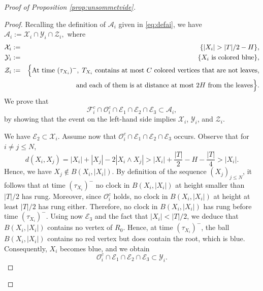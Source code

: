 \documentclass[french]{article}
\newcommand{\Tf}{T}
\renewcommand{\1}{\mathds{1}}
\begin{document}
\begin{proof}[Proof of Proposition \ref{prop:unsommetvide}]
\begin{proof}
Recalling the definition of $\mathcal{A}_i$ given in \eqref{eq:defai}, we have
$
\mathcal{A}_i := \mathcal{X}_i \cap \mathcal{Y}_i \cap \mathcal{Z}_i,
$
where
\begin{eqnarray*}
\mathcal{X}_i &:=& \{|X_i|>|\Tf|/2-H\},\\
\mathcal{Y}_i &:=& \{\text{$X_i$ is colored blue}\},\\
\mathcal{Z}_i &:=& \Bigl\{\text{At time } (\tau_{X_i})^{-},\; \Tf_{X_i} \text{ contains at most } C \text{ colored vertices that are not leaves,}\\
&& \qquad\quad \text{and each of them is at distance at most } 2H \text{ from the leaves}\Bigr\}.
\end{eqnarray*}
We prove that
$$
\mathcal{F}_i^c \cap \mathcal{O}_i^c \cap \mathcal{E}_1 \cap \mathcal{E}_2 \cap \mathcal{E}_3 \subset \mathcal{A}_i,
$$
by showing that the event on the left-hand side implies $\mathcal{X}_i$, $\mathcal{Y}_i$, and $\mathcal{Z}_i$.

\medskip

\noindent We have $\mathcal{E}_2 \subset \mathcal{X}_i$. Assume now that $\mathcal{O}_i^c \cap \mathcal{E}_1 \cap \mathcal{E}_2 \cap \mathcal{E}_3$ occurs. Observe that for $i \neq j \le N$,
$$
d(X_i,X_j)
= |X_i| + |X_j| - 2|X_i \wedge X_j|
> |X_i| + \frac{|\Tf|}{2} - H - \frac{|\Tf|}{4}
> |X_i|.
$$
Hence, we have $X_j \notin B(X_i,|X_i|)$. By definition of the sequence $(X_j)_{j\le N}$, it follows that at time $(\tau_{X_i})^{-}$ no clock in $B(X_i,|X_i|)$ at height smaller than $|\Tf|/2$ has rung. Moreover, since $\mathcal{O}_i^c$ holds, no clock in $B(X_i,|X_i|)$ at height at least $|\Tf|/2$ has rung either. Therefore, no clock in $B(X_i,|X_i|)$ has rung before time $(\tau_{X_i})^{-}$. Using now $\mathcal{E}_3$ and the fact that $|X_i|<|\Tf|/2$, we deduce that $B(X_i,|X_i|)$ contains no vertex of $R_0$. Hence, at time $(\tau_{X_i})^{-}$, the ball $B(X_i,|X_i|)$ contains no red vertex but does contain the root, which is blue. Consequently, $X_i$ becomes blue, and we obtain
$$
\mathcal{O}_i^c \cap \mathcal{E}_1 \cap \mathcal{E}_2 \cap \mathcal{E}_3 \subset \mathcal{Y}_i.
$$


\end{proof}
\end{proof}
\end{document}
